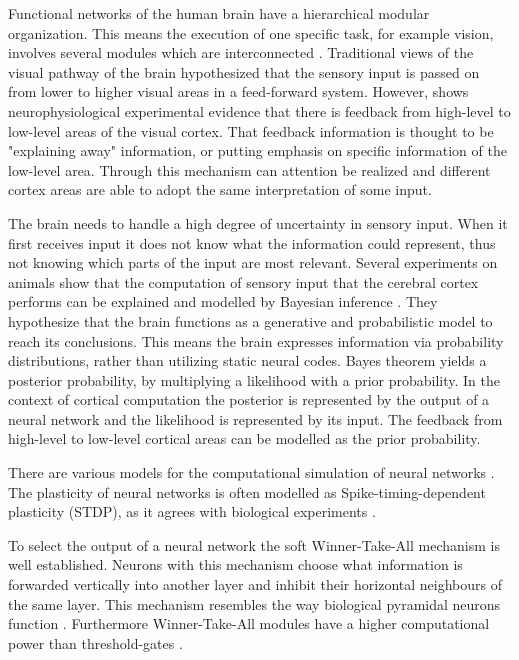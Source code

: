 Functional networks of the human brain have a hierarchical modular organization. This means the execution of one specific task, for example vision, involves several modules which are interconnected  \citep{hierarchicalBrain}. Traditional views of the visual pathway of the brain hypothesized that the sensory input is passed on from lower to higher visual areas in a feed-forward system. However, \citet{HierachicalBayesVisualCortex} shows  neurophysiological experimental evidence that there is feedback from high-level to low-level areas of the visual cortex. That feedback information is thought to be "explaining away" information, or putting emphasis on specific information of the low-level area. Through this mechanism can attention be realized and different cortex areas are able to adopt the same interpretation of some input.
 
The brain needs to handle a high degree of uncertainty in sensory input. When it first receives input it does not know what the information could represent, thus not knowing which parts of the input are most relevant. Several experiments on animals show that the computation of sensory input that the cerebral cortex performs can be explained and modelled by Bayesian inference \citep{neuralSubstrate, HierachicalBayesVisualCortex, anatomyOfInference}. They hypothesize that the brain functions as a generative and probabilistic model to reach its conclusions. This means the brain expresses information via probability distributions, rather than utilizing static neural codes. Bayes theorem yields a posterior probability, by multiplying a likelihood with a prior probability. In the context of cortical computation the posterior is represented by the output of a neural network and the likelihood is represented by its input. The feedback from high-level to low-level cortical areas can be modelled as the prior probability.

There are various models for the computational simulation of neural networks  \citep{SpikingNeuronModelsBook}. The plasticity of neural networks is often modelled as Spike-timing-dependent plasticity (STDP), as it agrees with biological experiments \citep{STDPFELDMAN, STDPDAN}. 

To select the output of a neural network the soft Winner-Take-All mechanism is well established. Neurons with this mechanism choose what information is forwarded vertically into another layer and inhibit their horizontal neighbours of the same layer.  This mechanism resembles the way biological pyramidal neurons function \citep{softWTA}. Furthermore Winner-Take-All modules have a higher computational power than threshold-gates \citep{WTAPower}.

